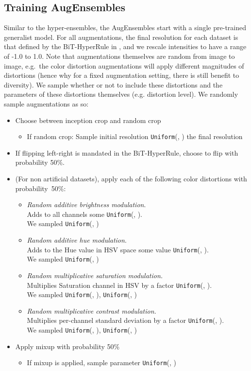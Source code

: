 \documentclass{article} \usepackage{iclr2021_conference,times}
\begin{document}
\subsection{Training AugEnsembles}
\label{app:training_aes}
Similar to the hyper-ensembles, the AugEnsembles start with a single pre-trained generalist model. For all augmentations, the final resolution for each dataset is that defined by the BiT-HyperRule in \citep{alex2019big}, and we rescale intensities to have a range of -1.0 to 1.0. Note that augmentations themselves are random from image to image, e.g.\ the color distortion augmentations will apply different magnitudes of distortions (hence why for a fixed augmentation setting, there is still benefit to diversity). We sample whether or not to include these distortions and the parameters of these distortions themselves (e.g. distortion level). We randomly sample augmentations as so:
\begin{itemize}
    \item Choose between inception crop and random crop
    \begin{itemize}
        \item If random crop: Sample initial resolution  \texttt{Uniform}(, )  the final resolution
    \end{itemize}
    \item If flipping left-right is mandated in the BiT-HyperRule, choose to flip with probability 50\%.
    \item (For non artificial datasets), apply each of the following color distortions with probability~50\%:
    \begin{itemize}
        \item \textit{Random additive brightness modulation}.\\
        Adds to all channels some  \texttt{Uniform}(, ).\\
        We sampled  \texttt{Uniform}(, )
        \item \textit{Random additive hue modulation}.\\
        Adds to the Hue value in HSV space some value  \texttt{Uniform}(, ).\\
        We sampled  \texttt{Uniform}(, )
        \item \textit{Random multiplicative saturation modulation.}\\
        Multiplies Saturation channel in HSV by a factor  \texttt{Uniform}(, ). \\ We sampled  \texttt{Uniform}(, ),  \texttt{Uniform}(, )
        \item \textit{Random multiplicative contrast modulation.}\\
        Multiplies per-channel standard deviation by a factor  \texttt{Uniform}(, ). \\ We sampled  \texttt{Uniform}(, ),  \texttt{Uniform}(, )
    \end{itemize}
    \item Apply mixup with probability 50\%
    \begin{itemize}
        \item If mixup is applied, sample  parameter  \texttt{Uniform}(, )
    \end{itemize}
\end{itemize}
\end{document}
